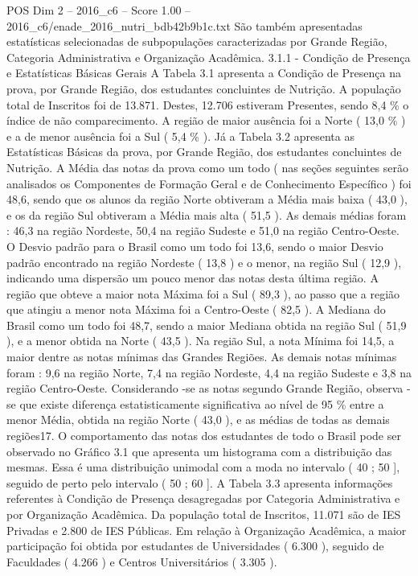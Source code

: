 \begin{textsample}{POS Dim 2 – 2016\_c6 – Score 1.00 – 2016\_c6/enade\_2016\_nutri\_bdb42b9b1c.txt}
São também apresentadas estatísticas selecionadas de subpopulações caracterizadas por Grande Região, Categoria Administrativa e Organização Acadêmica. 3.1.1 - Condição de Presença e Estatísticas Básicas Gerais A Tabela 3.1 apresenta a Condição de Presença na prova, por Grande Região, dos estudantes concluintes de Nutrição.
A população total de Inscritos foi de 13.871.
Destes, 12.706 estiveram Presentes, sendo 8,4 \% o índice de não comparecimento.
A região de maior ausência foi a Norte ( 13,0 \% ) e a de menor ausência foi a Sul ( 5,4 \% ).
Já a Tabela 3.2 apresenta as Estatísticas Básicas da prova, por Grande Região, dos estudantes concluintes de Nutrição.
A Média das notas da prova como um todo ( nas seções seguintes serão analisados os Componentes de Formação Geral e de Conhecimento Específico ) foi 48,6, sendo que os alunos da região Norte obtiveram a Média mais baixa ( 43,0 ), e os da região Sul obtiveram a Média mais alta ( 51,5 ).
As demais médias foram : 46,3 na região Nordeste, 50,4 na região Sudeste e 51,0 na região Centro-Oeste.
O Desvio padrão para o Brasil como um todo foi 13,6, sendo o maior Desvio padrão encontrado na região Nordeste ( 13,8 ) e o menor, na região Sul ( 12,9 ), indicando uma dispersão um pouco menor das notas desta última região.
A região que obteve a maior nota Máxima foi a Sul ( 89,3 ), ao passo que a região que atingiu a menor nota Máxima foi a Centro-Oeste ( 82,5 ).
A Mediana do Brasil como um todo foi 48,7, sendo a maior Mediana obtida na região Sul ( 51,9 ), e a menor obtida na Norte ( 43,5 ).
Na região Sul, a nota Mínima foi 14,5, a maior dentre as notas mínimas das Grandes Regiões.
As demais notas mínimas foram : 9,6 na região Norte, 7,4 na região Nordeste, 4,4 na região Sudeste e 3,8 na região Centro-Oeste.
Considerando -se as notas segundo Grande Região, observa -se que existe diferença estatisticamente significativa ao nível de 95 \% entre a menor Média, obtida na região Norte ( 43,0 ), e as médias de todas as demais regiões17.
O comportamento das notas dos estudantes de todo o Brasil pode ser observado no Gráfico 3.1 que apresenta um histograma com a distribuição das mesmas.
Essa é uma distribuição unimodal com a moda no intervalo ( 40 ; 50 ], seguido de perto pelo intervalo ( 50 ; 60 ].
A Tabela 3.3 apresenta informações referentes à Condição de Presença desagregadas por Categoria Administrativa e por Organização Acadêmica.
Da população total de Inscritos, 11.071 são de IES Privadas e 2.800 de IES Públicas.
Em relação à Organização Acadêmica, a maior participação foi obtida por estudantes de Universidades ( 6.300 ), seguido de Faculdades ( 4.266 ) e Centros Universitários ( 3.305 ).

\end{textsample}
